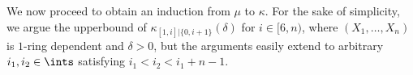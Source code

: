 \documentclass[aos]{imsart}
\begin{document}
\begin{appendix}
\medskip
{} 
%
We now proceed to obtain an induction from $\mu$ to $\kappa$. For the sake of simplicity, we argue the upperbound of $\kappa_{[1,i]|\{0, i+1\}}(\delta)$ for $i \in [6, n)$, where $(X_1, \dots, X_n)$ is $1$-ring dependent and $\delta > 0$, but the arguments easily extend to arbitrary $i_1, i_2 \in \ints$ satisfying $i_1 < i_2 < i_1+n-1$. 


\end{appendix}
\end{document}
